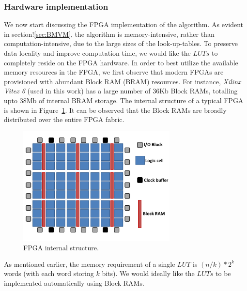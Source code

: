 \documentclass[conference, 9pt]{IEEEtran}
\begin{document}
\subsubsection{Hardware implementation}

We now start discussing the FPGA implementation of the algorithm. As evident in section!\ref{sec:BMVM}, the algorithm is memory-intensive, rather than computation-intensive, due to the large sizes of the look-up-tables. To preserve data locality and improve computation time, we would like the $LUTs$ to completely reside on the FPGA hardware. In order to best utilize the available memory resources in the FPGA, we first observe that modern FPGAs are provisioned with abundant Block RAM (BRAM) resources. For instance, \emph{Xilinx Vitex 6} (used in this work) has a large number of 36Kb Block RAMs, totalling upto 38Mb of internal BRAM storage. The internal structure of a typical FPGA is shown in Figure~\ref{FPGA}. It can be observed that the Block RAMs are broadly distributed over the entire FPGA fabric.\\

\begin{figure}[t!]
\centering
\includegraphics[scale=1, width=8cm]{figs/FPGA.pdf}
\caption{FPGA internal structure.}
\label{FPGA}
\end{figure}

As mentioned earlier, the memory requirement of a single $LUT$ is $(n/k)*2^k$ words (with each word storing $k$ bits). We would ideally like the $LUTs$ to be implemented automatically using Block RAMs. 
% 
%  
% 	  
  
\end{document}
